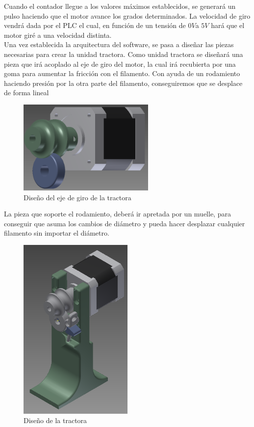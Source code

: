 Cuando el contador llegue a los valores máximos establecidos, se generará un pulso haciendo que el motor avance los grados determinados. La velocidad de giro vendrá dada por el PLC el cual, en función de un tensión de $0V $a $5V$ hará que el motor giré a una velocidad distinta.\\

Una vez establecida la arquitectura del software, se pasa a diseñar las piezas necesarias para crear la unidad tractora. Como unidad tractora se diseñará una pieza que irá acoplado al eje de giro del motor, la cual irá recubierta por una goma para aumentar la fricción con el filamento. Con ayuda de un rodamiento haciendo presión por la otra parte del filamento, conseguiremos que se desplace de forma lineal

\begin{figure}[H]
    \centering
    \includegraphics[width=0.6\textwidth]{images/producciones/tractora/motor.png}
    \caption{Diseño del eje de giro de la tractora}
    \label{fig:tractora}
\end{figure}


La pieza que soporte el rodamiento, deberá ir apretada por un muelle, para conseguir que asuma los cambios de diámetro y pueda hacer desplazar cualquier filamento sin importar el diámetro.

\begin{figure}[H]
    \centering
    \includegraphics[width=0.5\textwidth]{images/producciones/tractora/asembli.png}
    \caption{Diseño de la tractora}
    \label{fig:tractora2}
\end{figure}

